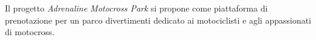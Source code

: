 Il progetto \textit{Adrenaline Motocross Park} si propone come piattaforma di prenotazione per un parco divertimenti dedicato ai motociclisti
e agli appassionati di motocross.